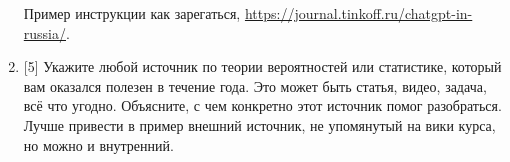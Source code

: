 \documentclass[12pt]{article} %
\begin{document}
\begin{enumerate}
    Пример инструкции как зарегаться, \url{https://journal.tinkoff.ru/chatgpt-in-russia/}.
 


    \item {[5]} Укажите любой источник по теории вероятностей или статистике, который вам оказался полезен 
    в течение года. 
    Это может быть статья, видео, задача, всё что угодно. Объясните, с чем конкретно этот источник помог 
    разобраться. Лучше привести в пример внешний источник, не упомянутый на вики курса,
    но можно и внутренний. 
    

\end{enumerate}
\end{document}
